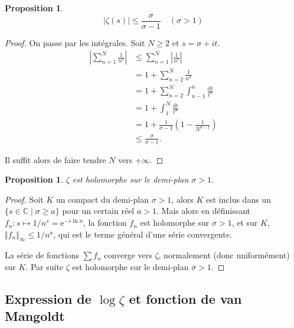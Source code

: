 \documentclass[french]{report}
\newtheorem{proposition}[theorem]{Proposition}
\begin{document}
\begin{proposition}\label{prop:zeta-majoration-facile}
  \[ |\zeta(s)|\leq\frac{\sigma}{\sigma-1}\quad(\sigma>1) \]
\end{proposition}

\begin{proof}
  On passe par les intégrales. Soit $N\geq2$ et $s=\sigma+it$.
  \begin{align*}
    \left|\sum_{n=1}^N\frac{1}{n^s}\right|
    &\leq \sum_{n=1}^N\left|\frac{1}{n^s}\right| \\
    &= 1 + \sum_{n=2}^N\frac{1}{n^\sigma} \\
    &= 1 + \sum_{n=2}^N\int_{n-1}^n\frac{\mathrm{d}t}{t^\sigma} \\
    &= 1 + \int_{1}^N\frac{\mathrm{d}t}{t^\sigma} \\
    &= 1 + \frac{1}{\sigma-1}\left(1-\frac{1}{N^{\sigma-1}}\right) \\
    &\leq \frac{\sigma}{\sigma-1}.
  \end{align*}

  Il suffit alors de faire tendre $N$ vers $+\infty$.
\end{proof}

\begin{proposition}
  $\zeta$ est holomorphe sur le demi-plan $\sigma > 1$.
\end{proposition}

\begin{proof}
  Soit $K$ un compact du demi-plan $\sigma > 1$, alors $K$ est inclus dans un $\{ s\in\mathbb{C} \mid \sigma \geq a \}$ pour un certain réel $a > 1$. Mais alors en définissant $f_n: s \mapsto 1 / n^s = \mathrm{e}^{-s\ln n}$, la fonction $f_n$ est holomorphe sur $\sigma > 1$, et sur $K$, $\Vert{f_n}\Vert_\infty \leq 1 / n^a$, qui est le terme général d'une série convergente.
  
  La série de fonctions $\sum f_n$ converge vers $\zeta$, normalement (donc uniformément) sur $K$. Par suite $\zeta$ est holomorphe sur le demi-plan $\sigma > 1$.
\end{proof}

\subsection{Expression de $\log\zeta$ et fonction de van Mangoldt}
\end{document}
